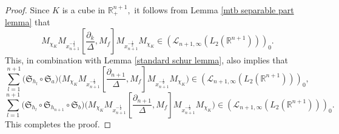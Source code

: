 \documentclass{amsart}
\begin{document}
\begin{proof}
Since $K$ is a cube in $\mathbb{R}^{n+1}_+,$ it follows from Lemma \ref{mtb separable part lemma} that
 $$M_{\chi_K}M_{x_{n+1}^{-\frac12}}[\frac{\partial_k}{\Delta},M_f]M_{x_{n+1}^{-\frac12}}M_{\chi_K}\in (\mathcal{L}_{n+1,\infty}(L_2(\mathbb{R}^{n+1})))_0.$$
This, in combination with Lemma \ref{standard schur lemma}, also implies that
$$\sum_{l=1}^{n+1}\Big(\mathfrak{S}_{h_l}\circ\mathfrak{S}_a\Big)\Big(M_{\chi_K}M_{x_{n+1}^{-\frac12}}[\frac{\partial_{n+1}}{\Delta},M_f]M_{x_{n+1}^{-\frac12}}M_{\chi_K}\Big)\in (\mathcal{L}_{n+1,\infty}(L_2(\mathbb{R}^{n+1})))_0,$$
$$\sum_{l=1}^{n+1}\Big(\mathfrak{S}_{h_l}\circ\mathfrak{S}_{h_{n+1}}\circ\mathfrak{S}_b\Big)\Big(M_{\chi_K}M_{x_{n+1}^{-\frac12}}[\frac{\partial_{n+1}}{\Delta},M_f]M_{x_{n+1}^{-\frac12}}M_{\chi_K}\Big)\in (\mathcal{L}_{n+1,\infty}(L_2(\mathbb{R}^{n+1})))_0.$$
This completes the proof.
\end{proof}
\end{document}
